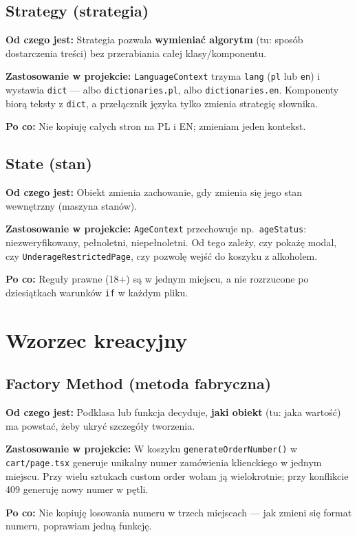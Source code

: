 \documentclass[12pt,a4paper]{report}
\newenvironment{calosc}{%
  \Needspace{17\baselineskip}%
  \begin{samepage}%
}{%
  \end{samepage}%
}
\begin{document}
\begin{calosc}
\subsection{Strategy (strategia)}

\textbf{Od czego jest:} Strategia pozwala \textbf{wymieniać algorytm} (tu: sposób dostarczenia treści) bez przerabiania całej klasy/komponentu.

\textbf{Zastosowanie w projekcie:} \texttt{LanguageContext} trzyma \texttt{lang} (\texttt{pl} lub \texttt{en}) i wystawia \texttt{dict} --- albo \texttt{dictionaries.pl}, albo \texttt{dictionaries.en}. Komponenty biorą teksty z \texttt{dict}, a przełącznik języka tylko zmienia strategię słownika.

\textbf{Po co:} Nie kopiuję całych stron na PL i EN; zmieniam jeden kontekst.
\end{calosc}

\begin{calosc}
\subsection{State (stan)}

\textbf{Od czego jest:} Obiekt zmienia zachowanie, gdy zmienia się jego stan wewnętrzny (maszyna stanów).

\textbf{Zastosowanie w projekcie:} \texttt{AgeContext} przechowuje np.\ \texttt{ageStatus}: niezweryfikowany, pełnoletni, niepełnoletni. Od tego zależy, czy pokażę modal, czy \texttt{UnderageRestrictedPage}, czy pozwolę wejść do koszyku z alkoholem.

\textbf{Po co:} Reguły prawne (18+) są w jednym miejscu, a nie rozrzucone po dziesiątkach warunków \texttt{if} w każdym pliku.
\end{calosc}

\section{Wzorzec kreacyjny}

\begin{calosc}
\subsection{Factory Method (metoda fabryczna)}

\textbf{Od czego jest:} Podklasa lub funkcja decyduje, \textbf{jaki obiekt} (tu: jaka wartość) ma powstać, żeby ukryć szczegóły tworzenia.

\textbf{Zastosowanie w projekcie:} W koszyku \texttt{generateOrderNumber()} w \texttt{cart/page.tsx} generuje unikalny numer zamówienia klienckiego w jednym miejscu. Przy wielu sztukach custom order wołam ją wielokrotnie; przy konflikcie 409 generuję nowy numer w pętli.

\textbf{Po co:} Nie kopiuję losowania numeru w trzech miejscach --- jak zmieni się format numeru, poprawiam jedną funkcję.
\end{calosc}
\end{document}
